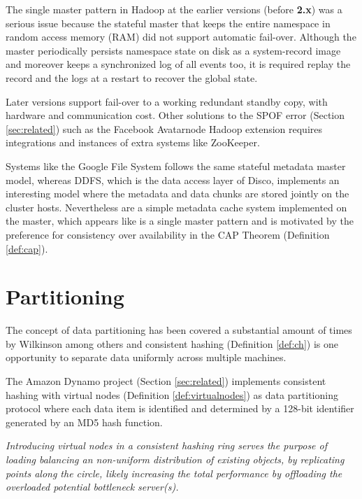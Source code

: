 The single master pattern in Hadoop at the earlier versions (before \textbf{2.x}) was a serious issue because the stateful master that keeps the entire namespace in random access memory (RAM) did not support automatic fail-over. Although the master periodically persists namespace state on disk as a system-record image and moreover keeps a synchronized log of all events too, it is required replay the record and the logs at a restart to recover the global state.

Later versions support fail-over to a working redundant standby copy, with hardware and communication cost. Other solutions to the SPOF error (Section \ref{sec:related}) such as the Facebook Avatarnode Hadoop extension requires integrations and instances of extra systems like ZooKeeper.
\newline

Systems like the Google File System follows the same stateful metadata master model, whereas DDFS, which is the data access layer of Disco, implements an interesting model where the metadata and data chunks are stored jointly on the cluster hosts. Nevertheless are a simple metadata cache system implemented on the master, which appears like is a single master pattern and is motivated by the preference for consistency over availability in the CAP Theorem (Definition \ref{def:cap}).

\section{Partitioning} \label{sec:partitioning}
The concept of data partitioning has been covered a substantial amount of times by Wilkinson \etal \cite{Wilkinson:1998:PPT:289352} among others and consistent hashing (Definition \ref{def:ch}) is one opportunity to separate data uniformly across multiple machines.

The Amazon Dynamo project (Section \ref{sec:related}) implements consistent hashing with virtual nodes (Definition \ref{def:virtualnodes}) as data partitioning protocol where each data item is identified and determined by a 128-bit identifier generated by an MD5 hash function.
\vspace*{3mm}

\begin{definition} \label{def:virtualnodes}
\textit{Introducing virtual nodes in a consistent hashing ring serves the purpose of loading balancing an non-uniform distribution of existing objects, by replicating points along the circle, likely increasing the total performance by offloading the overloaded potential bottleneck server(s).}
\end{definition}
\vspace*{3mm}

